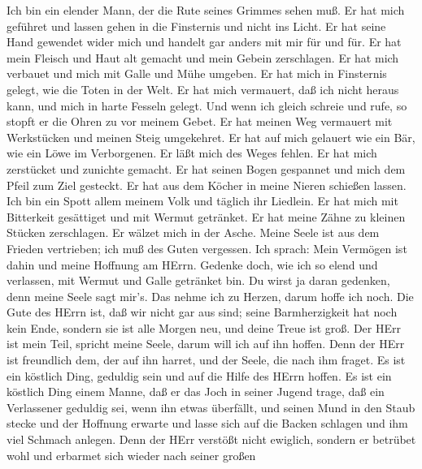  Ich bin ein elender Mann, der die Rute seines Grimmes sehen
muß.  Er hat mich geführet und lassen gehen in die
Finsternis und nicht ins Licht.  Er hat seine Hand gewendet
wider mich und handelt gar anders mit mir für und für.  Er
hat mein Fleisch und Haut alt gemacht und mein Gebein zerschlagen.
 Er hat mich verbauet und mich mit Galle und Mühe umgeben.
 Er hat mich in Finsternis gelegt, wie die Toten in der
Welt.  Er hat mich vermauert, daß ich nicht heraus kann, und
mich in harte Fesseln gelegt.  Und wenn ich gleich schreie
und rufe, so stopft er die Ohren zu vor meinem Gebet.  Er
hat meinen Weg vermauert mit Werkstücken und meinen Steig umgekehret.
 Er hat auf mich gelauert wie ein Bär, wie ein Löwe im
Verborgenen.  Er läßt mich des Weges fehlen. Er hat mich
zerstücket und zunichte gemacht.  Er hat seinen Bogen
gespannet und mich dem Pfeil zum Ziel gesteckt.  Er hat aus
dem Köcher in meine Nieren schießen lassen.  Ich bin ein
Spott allem meinem Volk und täglich ihr Liedlein.  Er hat
mich mit Bitterkeit gesättiget und mit Wermut getränket. 
Er hat meine Zähne zu kleinen Stücken zerschlagen. Er wälzet mich in der
Asche.  Meine Seele ist aus dem Frieden vertrieben; ich muß
des Guten vergessen.  Ich sprach: Mein Vermögen ist dahin
und meine Hoffnung am HErrn.  Gedenke doch, wie ich so
elend und verlassen, mit Wermut und Galle getränket bin. 
Du wirst ja daran gedenken, denn meine Seele sagt mir's. 
Das nehme ich zu Herzen, darum hoffe ich noch.  Die Gute
des HErrn ist, daß wir nicht gar aus sind; seine Barmherzigkeit hat noch
kein Ende,  sondern sie ist alle Morgen neu, und deine
Treue ist groß.  Der HErr ist mein Teil, spricht meine
Seele, darum will ich auf ihn hoffen.  Denn der HErr ist
freundlich dem, der auf ihn harret, und der Seele, die nach ihm fraget.
 Es ist ein köstlich Ding, geduldig sein und auf die Hilfe
des HErrn hoffen.  Es ist ein köstlich Ding einem Manne,
daß er das Joch in seiner Jugend trage,  daß ein
Verlassener geduldig sei, wenn ihn etwas überfällt,  und
seinen Mund in den Staub stecke und der Hoffnung erwarte 
und lasse sich auf die Backen schlagen und ihm viel Schmach anlegen.
 Denn der HErr verstößt nicht ewiglich, 
sondern er betrübet wohl und erbarmet sich wieder nach seiner großen
